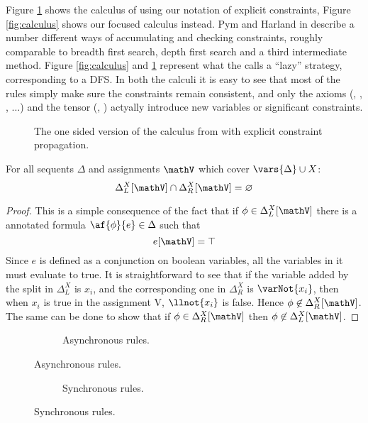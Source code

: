Figure \ref{fig:hp calculus} shows the calculus of \cite{HarlandPym} using our notation of explicit constraints, Figure \ref{fig:calculus} shows our focused calculus instead.
Pym and Harland in \cite{HarlandPym} describe a number different ways of accumulating and checking constraints, roughly comparable to breadth first search, depth first search and a third intermediate method.
Figure \ref{fig:calculus} and \ref{fig:hp calculus} represent what the \cite{HarlandPym} calls a ``lazy'' strategy, corresponding to a DFS.
In both the calculi it is easy to see that most of the rules simply make sure the constraints remain consistent, and only the axioms (\derRule{\displayid[1]}, \derRule{\displayid[2]}, , $\dots$) and the tensor (\derRule{\displayten}, \derRule[PH]{\displayten}) actyally introduce new variables or significant constraints.
\begin{figure}[h!]
	\centering
	
	\caption{The one sided version of the calculus from \cite{HarlandPym} with explicit constraint propagation.\label{fig:hp calculus}}
\end{figure}
\begin{lemma}
	\label{lemma:cap}
	For all sequents $\Delta$ and assignments $\mathV$ which cover $\vars{\Delta} \cup X$:
	$$ \Delta_L^X[\mathV] \cap \Delta_R^X[\mathV] = \varnothing $$
\end{lemma}
\begin{proof}
	This is a simple consequence of the fact that if $\phi \in \Delta_L^X[\mathV]$ there is a annotated formula $\af{\phi}{e} \in \Delta$ such that 
	$$ e[\mathV] = \top $$
	Since $e$ is defined as a conjunction on boolean variables, all the variables in it must evaluate to true.
	It is straightforward to see that if the variable added by the split in $\Delta_L^X$ is $x_i$, and the corresponding one in $\Delta_R^X$ is $\varNot{x_i}$, then when $x_i$ is true in the assignment V, $\llnot{x_i}$ is false.
	Hence $\phi \not \in \Delta_R^X[\mathV]$.
	The same can be done to show that if $\phi \in \Delta_R^X[\mathV]$ then $\phi \not \in \Delta_L^X[\mathV]$.
\end{proof}
\begin{figure}[p]
	\begin{subfigure}{\textwidth}
		\centering
		
		\caption{Asynchronous rules.\label{fig:asy calculus}}
	\end{subfigure}
\end{figure}
\begin{figure}[p]
	\ContinuedFloat
	\begin{subfigure}{\textwidth}
		\centering
		
		\caption{Synchronous rules.\label{fig:sync calculus}}
	\end{subfigure}
\end{figure}
